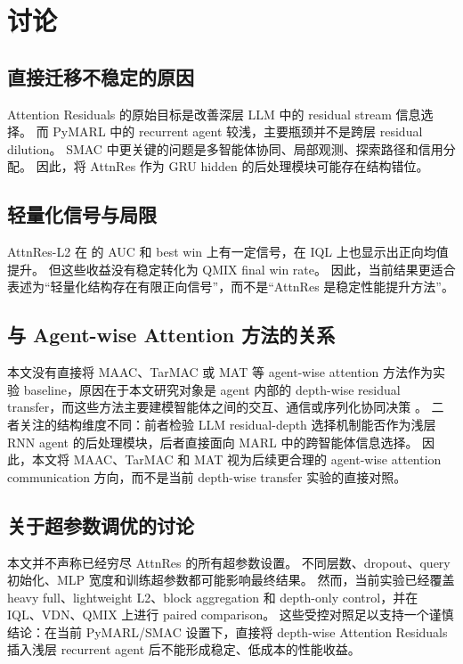 \section{讨论}

\subsection{直接迁移不稳定的原因}

Attention Residuals 的原始目标是改善深层 LLM 中的 residual stream 信息选择。
而 PyMARL 中的 recurrent agent 较浅，主要瓶颈并不是跨层 residual dilution。
SMAC 中更关键的问题是多智能体协同、局部观测、探索路径和信用分配。
因此，将 AttnRes 作为 GRU hidden 的后处理模块可能存在结构错位。

\subsection{轻量化信号与局限}

AttnRes-L2 在  的 AUC 和 best win 上有一定信号，在 IQL 上也显示出正向均值提升。
但这些收益没有稳定转化为 QMIX final win rate。
因此，当前结果更适合表述为“轻量化结构存在有限正向信号”，而不是“AttnRes 是稳定性能提升方法”。

\subsection{与 Agent-wise Attention 方法的关系}

本文没有直接将 MAAC、TarMAC 或 MAT 等 agent-wise attention 方法作为实验 baseline，原因在于本文研究对象是 agent 内部的 depth-wise residual transfer，而这些方法主要建模智能体之间的交互、通信或序列化协同决策 \cite{iqbal2019actor,das2019tarmac,wen2022multiagenttransformer}。
二者关注的结构维度不同：前者检验 LLM residual-depth 选择机制能否作为浅层 RNN agent 的后处理模块，后者直接面向 MARL 中的跨智能体信息选择。
因此，本文将 MAAC、TarMAC 和 MAT 视为后续更合理的 agent-wise attention communication 方向，而不是当前 depth-wise transfer 实验的直接对照。

\subsection{关于超参数调优的讨论}

本文并不声称已经穷尽 AttnRes 的所有超参数设置。
不同层数、dropout、query 初始化、MLP 宽度和训练超参数都可能影响最终结果。
然而，当前实验已经覆盖 heavy full、lightweight L2、block aggregation 和 depth-only control，并在 IQL、VDN、QMIX 上进行 paired comparison。
这些受控对照足以支持一个谨慎结论：在当前 PyMARL/SMAC 设置下，直接将 depth-wise Attention Residuals 插入浅层 recurrent agent 后不能形成稳定、低成本的性能收益。

